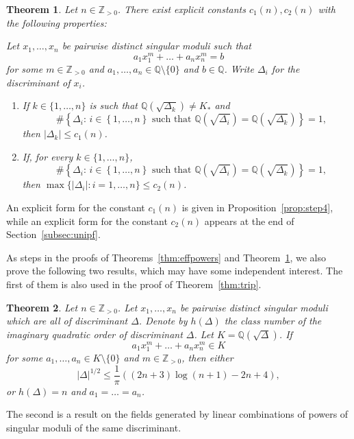 \documentclass[11pt,a4paper, british]{amsart}
\newtheorem{thm}{Theorem}[section]
\theoremstyle{definition}
\theoremstyle{remark}
\numberwithin{equation}{section}
\newcommand{\Q}{\mathbb{Q}} %
\newcommand{\Z}{\mathbb{Z}} %
\begin{document}
	\begin{thm}\label{thm:unifeffpowers}
		Let $n \in \Z_{>0}$. There exist explicit constants $c_1(n), c_2(n)$ with the following properties: 
		
		Let $x_1, \ldots, x_n$ be pairwise distinct singular moduli such that
		\[ a_1 x_1^m + \ldots + a_n x_n^m = b\]
		for some $m \in \Z_{>0}$ and $a_1, \ldots, a_n \in \Q \setminus \{0\}$ and $b \in \Q$.
		Write $\Delta_i$ for the discriminant of $x_i$. 
		\begin{enumerate}
			\item 	If	$k \in \{1, \ldots, n\}$ is such that $\Q(\sqrt{\Delta_k}) \neq K_*$ and
			\[  \quad \# \left \{ \Delta_i :  \, i \in \left \{1, \ldots, n\right \} \mbox{ such that } \Q\left(\sqrt{\Delta_i}\right) = \Q\left(\sqrt{\Delta_k}\right) \right \} = 1,\]
		then $\lvert \Delta_k \rvert  \leq c_1(n)$.
			\item If, for every	$k \in \{1, \ldots, n\}$,
			\[ \quad  \# \left \{ \Delta_i :  \, i \in \left \{1, \ldots, n\right \} \mbox{ such that } \Q\left(\sqrt{\Delta_i}\right) = \Q\left(\sqrt{\Delta_k}\right) \right \} = 1,\]
			then $ \max \{ \lvert \Delta_i \rvert : i=1, \ldots, n\} \leq c_2(n)$.
		\end{enumerate}
	\end{thm}

An explicit form for the constant $c_1(n)$ is given in Proposition~\ref{prop:step4}, while an explicit form for the constant $c_2(n)$ appears at the end of Section~\ref{subsec:unipf}. 
	
	As steps in the proofs of Theorems~\ref{thm:effpowers} and Theorem~\ref{thm:unifeffpowers}, we also prove the following two results, which may have some independent interest. The first of them is also used in the proof of Theorem~\ref{thm:trip}.
	
	\begin{thm}\label{thm:equal}
Let $n \in \Z_{>0}$. Let $x_1, \ldots, x_n$ be  pairwise distinct singular moduli which are all of discriminant $\Delta$. Denote by $h(\Delta)$ the class number of the imaginary quadratic order of discriminant $\Delta$. Let $K = \Q(\sqrt{\Delta})$. If
\[a_1 x_1^m + \ldots + a_n x_n^m \in K\]
for some $a_1, \ldots, a_n \in K \setminus \{0\}$ and $m \in \Z_{>0}$, then either
\[ \lvert \Delta \rvert^{1/2} \leq \frac{1}{\pi} \left(\left(2n+3\right) \log\left(n+1\right) -2n +4\right),\]
or $h(\Delta) = n$ and $a_1 = \ldots = a_n$.
	\end{thm}
	
	The second is a result on the fields generated by linear combinations of powers of singular moduli of the same discriminant.
	
\end{document}
